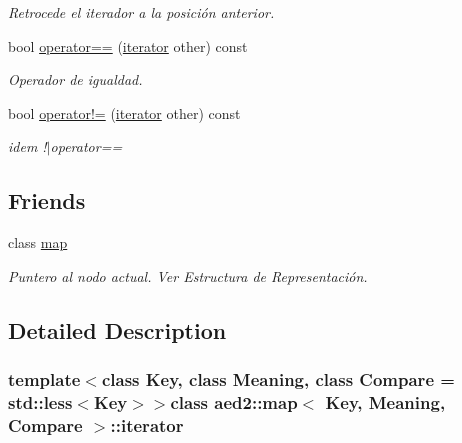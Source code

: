 \begin{DoxyCompactItemize}
\begin{DoxyCompactList}\small\item\em \-Retrocede el iterador a la posición anterior. \end{DoxyCompactList}\item 
bool \hyperlink{classaed2_1_1map_1_1iterator_ad052c1ef8477a1613c292202226053a5}{operator==} (\hyperlink{classaed2_1_1map_1_1iterator}{iterator} other) const 
\begin{DoxyCompactList}\small\item\em \-Operador de igualdad. \end{DoxyCompactList}\item 
\hypertarget{classaed2_1_1map_1_1iterator_a836c7a166d63f507c4f79085ae953c51}{bool \hyperlink{classaed2_1_1map_1_1iterator_a836c7a166d63f507c4f79085ae953c51}{operator!=} (\hyperlink{classaed2_1_1map_1_1iterator}{iterator} other) const }\label{classaed2_1_1map_1_1iterator_a836c7a166d63f507c4f79085ae953c51}

\begin{DoxyCompactList}\small\item\em idem !$|$operator== \end{DoxyCompactList}\end{DoxyCompactItemize}
\subsection*{\-Friends}
\begin{DoxyCompactItemize}
\item 
\hypertarget{classaed2_1_1map_1_1iterator_aeda338414e516b47761f994fb78056c6}{class \hyperlink{classaed2_1_1map_1_1iterator_aeda338414e516b47761f994fb78056c6}{map}}\label{classaed2_1_1map_1_1iterator_aeda338414e516b47761f994fb78056c6}

\begin{DoxyCompactList}\small\item\em \-Puntero al nodo actual. \-Ver \-Estructura de \-Representación. \end{DoxyCompactList}\end{DoxyCompactItemize}


\subsection{\-Detailed \-Description}
\subsubsection*{template$<$class \-Key, class \-Meaning, class \-Compare = std\-::less$<$\-Key$>$$>$class aed2\-::map$<$ Key, Meaning, Compare $>$\-::iterator}

